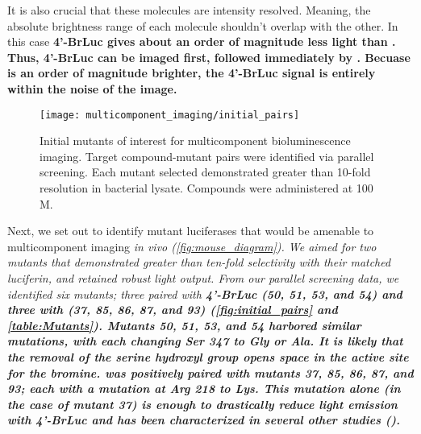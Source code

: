 \begin{thoughts}
  It is also crucial that these molecules are intensity resolved. Meaning, the absolute brightness range of each molecule shouldn't overlap with the other. In this case \bf{4'-BrLuc} gives about an order of magnitude less light than \dluc{}. Thus, \bf{4'-BrLuc} can be imaged first, followed immediately by \dluc{}. Becuase \dluc{} is an order of magnitude brighter, the \bf{4'-BrLuc} signal is entirely within the noise of the image.
\end{thoughts}

\begin{figure}[htbp]
\texttt{[image: multicomponent\_imaging/initial\_pairs]}
\centering
\caption[Initial mutants of interest for multicomponent bioluminescence imaging]{Initial mutants of interest for multicomponent bioluminescence imaging. Target compound-mutant pairs were identified via parallel screening.\cite{RathbunParallelScreeningRapid2017} Each mutant selected demonstrated greater than 10-fold resolution in bacterial lysate. Compounds were administered at 100 \textmu{}M.
}
  \label{fig:initial_pairs}
\end{figure}

Next, we set out to identify mutant luciferases that would be amenable to multicomponent imaging \it{in vivo} (\autoref{fig:mouse_diagram}). We aimed for two mutants that demonstrated greater than ten-fold selectivity with their matched luciferin, and retained robust light output. From our parallel screening data, we identified six mutants; three paired with \bf{4'-BrLuc} (50, 51, 53, and 54) and three with \dluc{} (37, 85, 86, 87, and 93) (\autoref{fig:initial_pairs} and \autoref{table:Mutants}).
Mutants 50, 51, 53, and 54 harbored similar mutations, with each changing Ser 347 to Gly or Ala. It is likely that the removal of the serine hydroxyl group opens space in the active site for the bromine.
\dluc{} was positively paired with mutants 37, 85, 86, 87, and 93; each with a mutation at Arg 218 to Lys. This mutation alone (in the case of mutant 37) is enough to drastically reduce light emission with \bf{4'-BrLuc} and has been characterized in several other studies ().

